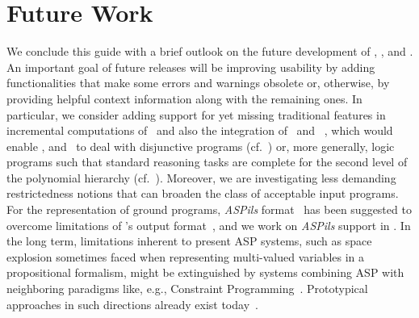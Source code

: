\section{Future Work}\label{sec:future}

We conclude this guide with a brief outlook on the future development
of \gringo, \clasp, and \clingo.
An important goal of future releases will be improving usability
by adding functionalities that make some errors and warnings obsolete or,
otherwise, by providing helpful context information along with the remaining ones.
In particular, we consider adding support for yet missing traditional
features in incremental computations of \iclingo\
and also the integration of \clasp\ and \claspD~\cite{drgegrkakoossc08a},
which would enable \clasp, and \clingo\ to deal with disjunctive programs
(cf.~\cite{eitgot95a}) or, more generally, logic programs such that standard reasoning tasks
are complete for the second level of the polynomial hierarchy (cf.~\cite{papadimitriou94a}).
Moreover, we are investigating less demanding restrictedness notions
that can broaden the class of
acceptable input programs.
For the representation of ground programs,
\emph{ASPils} format~\cite{gejaosscth08a} has been suggested to overcome
limitations of \lparse's output format~\cite{lparseManual},
and we work on \emph{ASPils} support in \clasp.
In the long term,
limitations inherent to present ASP systems,
such as space explosion sometimes faced when representing
multi-valued variables in a propositional formalism,
might be extinguished by systems combining ASP with
neighboring paradigms like, e.g., Constraint Programming~\cite{CPHandbook}.
Prototypical approaches in such directions already exist
today~\cite{melgel08a,niolti06a}.


